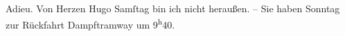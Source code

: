 \begin{ledgroupsized}[t]{13cm}
           \pstart Adieu. Von Herzen \spacefill\mbox{Hugo}\pend{}\pstart
           Samſtag bin ich nicht heraußen.\pend
           \pstart
           \numberlinefalse{}–\numberlinetrue{}\pend
           \pstart
           Sie haben Sonntag zur Rückfahrt Dampftramway um 9\textsuperscript{h}40.\pend
           
         
         \endnumbering{}\end{ledgroupsized}  \newcommand{\dateiname}{L01200}\newcommand{\titel}{Hugo von Hofmannsthal an Arthur Schnitzler, [5. 2. 1902?]}\newcommand{\editorInnen}{Martin Anton Müller und Gerd-Hermann Susen}
      